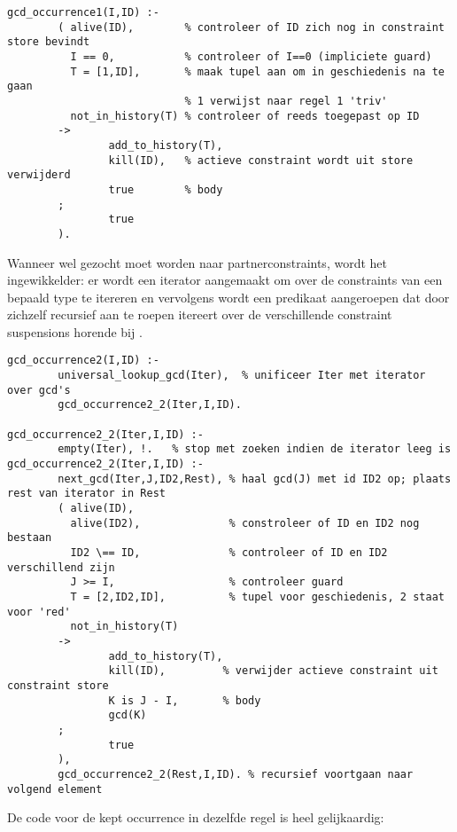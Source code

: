 {\scriptsize \begin{Verbatim}[frame=single]
gcd_occurrence1(I,ID) :-
        ( alive(ID),        % controleer of ID zich nog in constraint store bevindt
          I == 0,           % controleer of I==0 (impliciete guard)
          T = [1,ID],       % maak tupel aan om in geschiedenis na te gaan
                            % 1 verwijst naar regel 1 'triv'
          not_in_history(T) % controleer of reeds toegepast op ID
        ->
                add_to_history(T),
                kill(ID),   % actieve constraint wordt uit store verwijderd
                true        % body
        ;
                true
        ).
\end{Verbatim}
}

Wanneer wel gezocht moet worden naar partnerconstraints, wordt het ingewikkelder: er wordt een iterator aangemaakt om over de constraints van een bepaald type te itereren en vervolgens wordt een predikaat aangeroepen dat door zichzelf recursief aan te roepen itereert over de verschillende constraint suspensions horende bij .

{\scriptsize \begin{Verbatim}[frame=single]
gcd_occurrence2(I,ID) :-
        universal_lookup_gcd(Iter),  % unificeer Iter met iterator over gcd's
        gcd_occurrence2_2(Iter,I,ID).

gcd_occurrence2_2(Iter,I,ID) :-
        empty(Iter), !.   % stop met zoeken indien de iterator leeg is
gcd_occurrence2_2(Iter,I,ID) :-
        next_gcd(Iter,J,ID2,Rest), % haal gcd(J) met id ID2 op; plaats rest van iterator in Rest
        ( alive(ID),
          alive(ID2),              % constroleer of ID en ID2 nog bestaan
          ID2 \== ID,              % controleer of ID en ID2 verschillend zijn
          J >= I,                  % controleer guard
          T = [2,ID2,ID],          % tupel voor geschiedenis, 2 staat voor 'red'
          not_in_history(T)
        ->
                add_to_history(T),
                kill(ID),         % verwijder actieve constraint uit constraint store
                K is J - I,       % body
                gcd(K)
        ;
                true
        ),
        gcd_occurrence2_2(Rest,I,ID). % recursief voortgaan naar volgend element
\end{Verbatim}
}

De code voor de kept occurrence in dezelfde regel is heel gelijkaardig:

